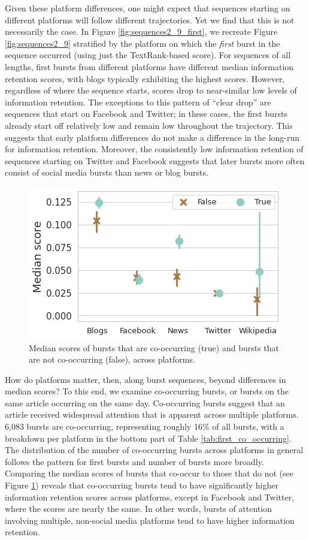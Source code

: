 \documentclass[letterpaper]{article} %
\begin{document}
Given these platform differences, one might expect that sequences starting on different platforms will follow different trajectories. Yet we find that this is not necessarily the case. In Figure \ref{fig:sequences2_9_first}, we recreate Figure \ref{fig:sequences2_9} stratified by the platform on which the \textit{first} burst in the sequence occurred (using just the TextRank-based score). For sequences of all lengths, first bursts from different platforms have different median information retention scores, with blogs typically exhibiting the highest scores. However, regardless of where the sequence starts, scores drop to near-similar low levels of information retention. The exceptions to this pattern of ``clear drop'' are sequences that start on Facebook and Twitter; in these cases, the first bursts already start off relatively low and remain low throughout the trajectory.
This suggests that early platform differences do not make a difference in the long-run for information retention. Moreover, the consistently low information retention of sequences starting on Twitter and Facebook suggests that later bursts more often consist of social media bursts than news or blog bursts.

\begin{figure}[t]
    \centering
    \includegraphics[width=0.8\columnwidth]{figs/fig6.png}
    \caption{Median scores of bursts that are co-occurring (true) and bursts that are not co-occurring (false), across platforms.}
    \label{fig:co_occurring}
\end{figure}

How do platforms matter, then, along burst sequences, beyond differences in median scores?
To this end, we examine co-occurring bursts, or bursts on the same article occurring on the same day. Co-occurring bursts suggest that an article received widespread attention that is apparent across multiple platforms. 6,083 bursts are co-occurring, representing roughly 16\% of all bursts, with a breakdown per platform in the bottom part of Table \ref{tab:first_co_occurring}. The distribution of the number of co-occurring bursts across platforms in general follows the pattern for first bursts and number of bursts more broadly.
Comparing the median scores of bursts that co-occur to those that do not (see Figure \ref{fig:co_occurring}) reveals that co-occurring bursts tend to have significantly higher information retention scores across platforms, except in Facebook and Twitter, where the scores are nearly the same. In other words, bursts of attention involving multiple, non-social media platforms tend to have higher information retention.
\end{document}
